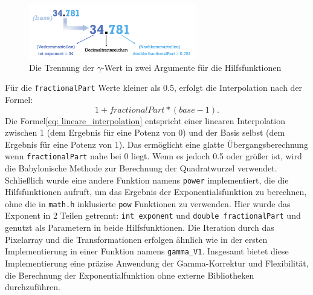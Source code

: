 \documentclass[course=erap]{aspdoc}
\begin{document}
\begin{figure}[h]
\centering
\includegraphics[width =0.65\textwidth]{nr_photo.png}
\caption{Die Trennung der $\gamma$-Wert in zwei Argumente für die Hilfsfunktionen}
\label{fig:4}
\end{figure}

Für die \texttt{fractionalPart} Werte kleiner als 0.5, erfolgt die Interpolation nach der Formel:
\begin{equation}
    1 + fractionalPart * (base - 1). \label{eq: lineare_interpolation}
\end{equation}
Die Formel\eqref{eq: lineare_interpolation} entspricht einer linearen Interpolation zwischen 1 (dem Ergebnis für eine Potenz von 0) und der Basis selbst (dem Ergebnis für eine Potenz von 1). Das ermöglicht eine glatte Übergangsberechnung wenn  \texttt{fractionalPart} nahe bei 0 liegt. Wenn es jedoch 0.5 oder größer ist, wird die Babylonische Methode\cite{BabylMeth} zur Berechnung der Quadratwurzel verwendet. Schließlich wurde eine andere Funktion namens \texttt{power} implementiert, die die Hilfsfunktionen aufruft, um das Ergebnis der Exponentialsfunktion zu berechnen, ohne die in \texttt{math.h} inklusierte \texttt{pow} Funktionen zu verwenden. Hier wurde das Exponent in 2 Teilen getrennt: \texttt{int exponent} und \texttt{double fractionalPart} und genutzt als Parametern in beide Hilfsfunktionen. Die Iteration durch das Pixelarray und die Transformationen erfolgen ähnlich wie in der ersten Implementierung in einer Funktion namens \texttt{gamma\_V1}. 
Insgesamt bietet diese Implementierung eine präzise Anwendung der Gamma-Korrektur und Flexibilität, die Berechnung der Exponentialfunktion ohne externe Bibliotheken durchzuführen. 
\end{document}
